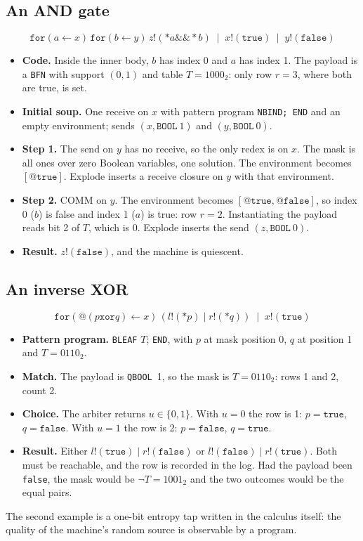 \documentclass[11pt]{article}
\makeatletter
\newcommand{\kw}[1]{\texttt{#1}}
\newcommand{\tru}{\kw{true}}
\newcommand{\fls}{\kw{false}}
\newcommand{\band}{\mathbin{\&\&}}
\newcommand{\bxor}{\mathbin{\kw{xor}}}
\newcommand{\quo}[1]{@#1}
\newcommand{\drp}[1]{{*}#1}
\newcommand{\for}[3]{\kw{for}(#1 \leftarrow #2)\,#3}
\newcommand{\snd}[2]{#1!(#2)}
\newcommand{\cpar}{\mathbin{|}}
\theoremstyle{definition}
\theoremstyle{remark}
\makeatother
\begin{document}
\subsection*{An AND gate}

\[
\for{a}{x}{\for{b}{y}{\snd{z}{\drp{a} \band \drp{b}}}} \;\cpar\;
\snd{x}{\tru} \;\cpar\; \snd{y}{\fls}
\]
\begin{itemize}
\item \textbf{Code.} Inside the inner body, $b$ has index 0 and $a$ has
index 1. The payload is a \kw{BFN} with support $(0,1)$ and table
$T = 1000_2$: only row $r=3$, where both are true, is set.
\item \textbf{Initial soup.} One receive on $x$ with pattern program
\kw{NBIND; END} and an empty environment; sends $(x,\kw{BOOL}\ 1)$ and
$(y,\kw{BOOL}\ 0)$.
\item \textbf{Step 1.} The send on $y$ has no receive, so the only redex is
on $x$. The mask is all ones over zero Boolean variables, one solution.
The environment becomes $[\quo{\tru}]$. Explode inserts a receive closure on
$y$ with that environment.
\item \textbf{Step 2.} COMM on $y$. The environment becomes
$[\quo{\tru},\quo{\fls}]$, so index 0 ($b$) is false and index 1 ($a$) is
true: row $r = 2$. Instantiating the payload reads bit 2 of $T$, which is 0.
Explode inserts the send $(z,\kw{BOOL}\ 0)$.
\item \textbf{Result.} $\snd{z}{\fls}$, and the machine is quiescent.
\end{itemize}

\subsection*{An inverse XOR}

\[
\for{\quo{(p \bxor q)}}{x}{(\snd{l}{\drp{p}} \cpar \snd{r}{\drp{q}})}
\;\cpar\; \snd{x}{\tru}
\]
\begin{itemize}
\item \textbf{Pattern program.} \kw{BLEAF} $T$; \kw{END}, with $p$ at mask
position 0, $q$ at position 1 and $T = 0110_2$.
\item \textbf{Match.} The payload is \kw{QBOOL}~1, so the mask is
$T = 0110_2$: rows 1 and 2, count 2.
\item \textbf{Choice.} The arbiter returns $u \in \{0,1\}$. With $u=0$ the
row is 1: $p=\tru$, $q=\fls$. With $u=1$ the row is 2: $p=\fls$, $q=\tru$.
\item \textbf{Result.} Either $\snd{l}{\tru} \cpar \snd{r}{\fls}$ or
$\snd{l}{\fls} \cpar \snd{r}{\tru}$. Both must be reachable, and the row is
recorded in the log. Had the payload been \fls, the mask would be
$\neg T = 1001_2$ and the two outcomes would be the equal pairs.
\end{itemize}
The second example is a one-bit entropy tap written in the calculus itself:
the quality of the machine's random source is observable by a program.
\end{document}
